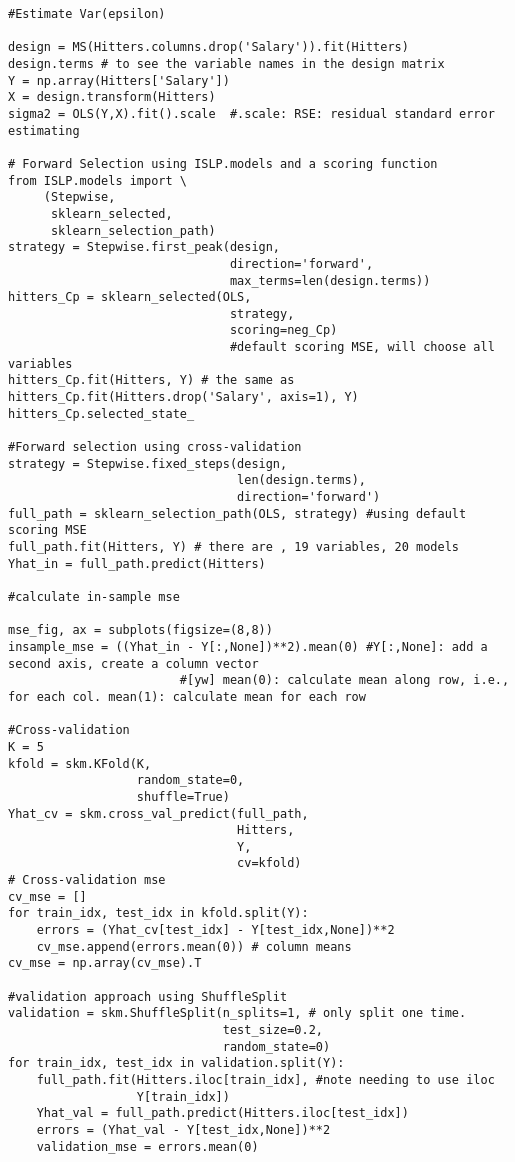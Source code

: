 \documentclass[
  letterpaper,
  DIV=11,
  numbers=noendperiod]{scrreprt}
\begin{document}
\begin{verbatim}
#Estimate Var(epsilon)

design = MS(Hitters.columns.drop('Salary')).fit(Hitters)
design.terms # to see the variable names in the design matrix
Y = np.array(Hitters['Salary'])
X = design.transform(Hitters)
sigma2 = OLS(Y,X).fit().scale  #.scale: RSE: residual standard error estimating 

# Forward Selection using ISLP.models and a scoring function
from ISLP.models import \
     (Stepwise,
      sklearn_selected,
      sklearn_selection_path)
strategy = Stepwise.first_peak(design,
                               direction='forward',
                               max_terms=len(design.terms))
hitters_Cp = sklearn_selected(OLS,
                               strategy,
                               scoring=neg_Cp)
                               #default scoring MSE, will choose all variables
hitters_Cp.fit(Hitters, Y) # the same as hitters_Cp.fit(Hitters.drop('Salary', axis=1), Y)
hitters_Cp.selected_state_

#Forward selection using cross-validation
strategy = Stepwise.fixed_steps(design,
                                len(design.terms),
                                direction='forward')
full_path = sklearn_selection_path(OLS, strategy) #using default scoring MSE
full_path.fit(Hitters, Y) # there are , 19 variables, 20 models
Yhat_in = full_path.predict(Hitters)

#calculate in-sample mse

mse_fig, ax = subplots(figsize=(8,8))
insample_mse = ((Yhat_in - Y[:,None])**2).mean(0) #Y[:,None]: add a second axis, create a column vector
                        #[yw] mean(0): calculate mean along row, i.e., for each col. mean(1): calculate mean for each row

#Cross-validation
K = 5
kfold = skm.KFold(K,
                  random_state=0,
                  shuffle=True)
Yhat_cv = skm.cross_val_predict(full_path,
                                Hitters,
                                Y,
                                cv=kfold)
# Cross-validation mse
cv_mse = []
for train_idx, test_idx in kfold.split(Y):
    errors = (Yhat_cv[test_idx] - Y[test_idx,None])**2
    cv_mse.append(errors.mean(0)) # column means
cv_mse = np.array(cv_mse).T

#validation approach using ShuffleSplit
validation = skm.ShuffleSplit(n_splits=1, # only split one time. 
                              test_size=0.2,
                              random_state=0)
for train_idx, test_idx in validation.split(Y):
    full_path.fit(Hitters.iloc[train_idx], #note needing to use iloc
                  Y[train_idx])
    Yhat_val = full_path.predict(Hitters.iloc[test_idx])
    errors = (Yhat_val - Y[test_idx,None])**2
    validation_mse = errors.mean(0)
\end{verbatim}
\end{document}
